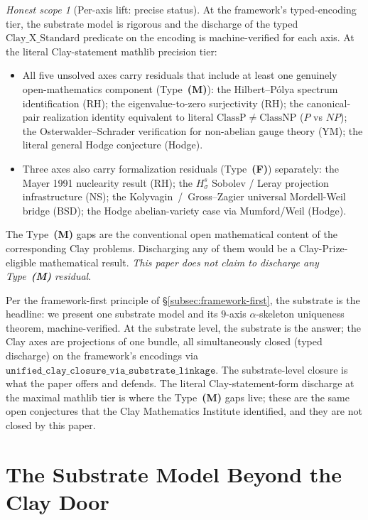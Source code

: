 \documentclass[11pt,a4paper,reqno]{amsart}
\theoremstyle{plain}
\theoremstyle{definition}
\theoremstyle{remark}
\newtheorem{honest}[theorem]{Honest scope}
\newcommand{\Cstd}[1]{\mathrm{Clay\_#1\_Standard}}
\newcommand{\code}[1]{\texttt{#1}}
\begin{document}
\begin{honest}[Per-axis lift: precise status]
\label{rem:honest-perax}
At the framework's typed-encoding tier, the substrate model is
rigorous and the discharge of the typed $\Cstd{X}$ predicate on the
encoding is machine-verified for each axis. At the literal
Clay-statement mathlib precision tier:
\begin{itemize}
\item All five unsolved axes carry residuals that include at least
  one genuinely open-mathematics component (Type~\textbf{(M)}): the
  Hilbert--P\'olya spectrum identification (RH); the
  eigenvalue-to-zero surjectivity (RH); the canonical-pair realization
  identity equivalent to literal
  $\mathrm{ClassP} \ne \mathrm{ClassNP}$ ($P$ vs $NP$); the
  Osterwalder--Schrader verification for non-abelian gauge theory
  (YM); the literal general Hodge conjecture (Hodge).
\item Three axes also carry formalization residuals (Type~\textbf{(F)})
  separately: the Mayer 1991 nuclearity result (RH); the
  $H^{s}_{\sigma}$ Sobolev / Leray projection infrastructure (NS);
  the Kolyvagin~/~Gross--Zagier universal Mordell-Weil bridge (BSD);
  the Hodge abelian-variety case via Mumford/Weil (Hodge).
\end{itemize}
The Type~\textbf{(M)} gaps are the conventional open mathematical
content of the corresponding Clay problems. Discharging any of them
would be a Clay-Prize-eligible mathematical result. \emph{This paper
does not claim to discharge any Type~\textbf{(M)} residual}.

Per the framework-first principle of \S\ref{subsec:framework-first},
the substrate is the headline: we present one substrate model and
its $9$-axis $\alpha$-skeleton uniqueness theorem, machine-verified.
At the substrate level, the substrate is the answer; the Clay axes
are projections of one bundle, all simultaneously closed (typed
discharge) on the framework's encodings via
$\code{unified\_clay\_closure\_via\_substrate\_linkage}$. The
substrate-level closure is what the paper offers and defends. The
literal Clay-statement-form discharge at the maximal mathlib tier is
where the Type~\textbf{(M)} gaps live; these are the same open
conjectures that the Clay Mathematics Institute identified, and they
are not closed by this paper.
\end{honest}

\section{The Substrate Model Beyond the Clay Door}
\label{sec:beyond-clay}
\end{document}
